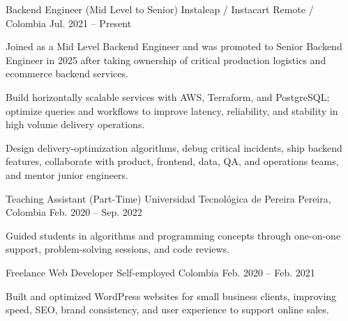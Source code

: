 \documentclass[]{awesome-cv}
\begin{document}
\begin{cventries}
  \cventry
  {Backend Engineer (Mid Level to Senior)}
  {Instaleap / Instacart}
  {Remote / Colombia}
  {Jul. 2021 -- Present}
  {\begin{cvitems}
    \item {Joined as a Mid Level Backend Engineer and was promoted to Senior Backend Engineer in 2025 after taking ownership of critical production logistics and ecommerce backend services.}
    \item {Build horizontally scalable services with AWS, Terraform, and PostgreSQL; optimize queries and workflows to improve latency, reliability, and stability in high volume delivery operations.}
    \item {Design delivery-optimization algorithms, debug critical incidents, ship backend features, collaborate with product, frontend, data, QA, and operations teams, and mentor junior engineers.}
  \end{cvitems}}

  \cventry
  {Teaching Assistant (Part-Time)}
  {Universidad Tecnológica de Pereira}
  {Pereira, Colombia}
  {Feb. 2020 -- Sep. 2022}
  {\begin{cvitems}
    \item {Guided students in algorithms and programming concepts through one-on-one support, problem-solving sessions, and code reviews.}
  \end{cvitems}}

  \cventry
  {Freelance Web Developer}
  {Self-employed}
  {Colombia}
  {Feb. 2020 -- Feb. 2021}
  {\begin{cvitems}
    \item {Built and optimized WordPress websites for small business clients, improving speed, SEO, brand consistency, and user experience to support online sales.}
  \end{cvitems}}
\end{cventries}
\vspace{-3mm}
\end{document}
